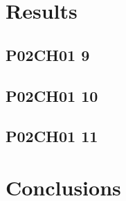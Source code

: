 \section{Results}
\lipsum[1]


\subsection{P02CH01 9}
\lipsum[1]

\subsection{P02CH01 10}\label{sssec:FD_dist}
\lipsum[1-4]

\subsection{P02CH01 11}\label{sssec:FD_rg}
\lipsum[1-4]

\section{Conclusions}
\lipsum[1-4]
